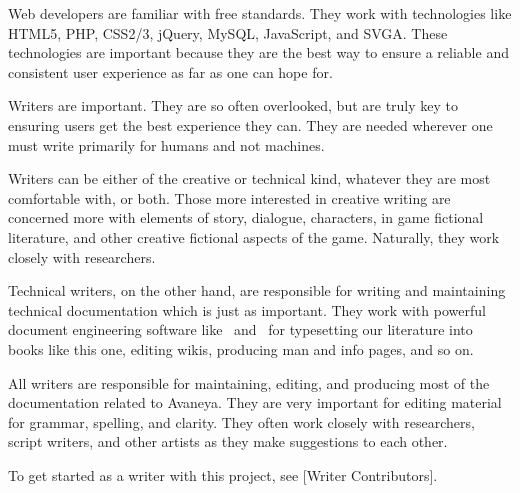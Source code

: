 Web developers are familiar with free standards. They work with technologies like HTML5, PHP, CSS2/3, jQuery, MySQL, JavaScript, and SVGA. These technologies are important because they are the best way to ensure a reliable and consistent user experience as far as one can hope for.


Writers are important. They are so often overlooked, but are truly key to ensuring users get the best experience they can. They are needed wherever one must write primarily for humans and not machines. 

Writers can be either of the creative or technical kind, whatever they are most comfortable with, or both. Those more interested in creative writing are concerned more with elements of story, dialogue, characters, in game fictional literature, and other creative fictional aspects of the game. Naturally, they work closely with researchers.

Technical writers, on the other hand, are responsible for writing and maintaining technical documentation which is just as important. They work with powerful document engineering software like \BIBTEX\ and \CONTEXT\ for typesetting our literature into books like this one, editing wikis, producing man and info pages, and so on.

All writers are responsible for maintaining, editing, and producing most of the documentation related to Avaneya. They are very important for editing material for grammar, spelling, and clarity. They often work closely with researchers, script writers, and other artists as they make suggestions to each other. 

To get started as a writer with this project, see [Writer Contributors].

\StopChapter
